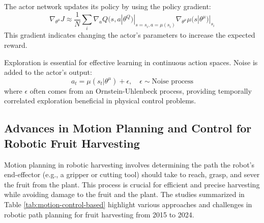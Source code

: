 \documentclass[a4paper,fleqn]{cas-dc}
\begin{document}
The actor network updates its policy by using the policy gradient:
\begin{equation}
\nabla_{\theta^\mu} J \approx \frac{1}{N} \sum_i \nabla_a Q(s, a | \theta^Q)|_{s=s_i, a=\mu(s_i)} \nabla_{\theta^\mu} \mu(s | \theta^\mu)|_{s_i}
\end{equation}
This gradient indicates changing the actor's parameters to increase the expected reward.

Exploration is essential for effective learning in continuous action spaces. Noise is added to the actor's output:
\begin{equation}
a_t = \mu(s_t|\theta^\mu) + \epsilon, \quad \epsilon \sim \text{Noise process}
\end{equation}
where \( \epsilon \) often comes from an Ornstein-Uhlenbeck process, providing temporally correlated exploration beneficial in physical control problems.

\subsection{Advances in Motion Planning and Control for Robotic Fruit Harvesting}
Motion planning in robotic harvesting involves determining the path the robot's end-effector (e.g., a gripper or cutting tool) should take to reach, grasp, and sever the fruit from the plant. This process is crucial for efficient and precise harvesting while avoiding damage to the fruit and the plant. The studies summarized in Table \ref{tab:motion-control-based} highlight various approaches and challenges in robotic path planning for fruit harvesting from 2015 to 2024.
\end{document}
